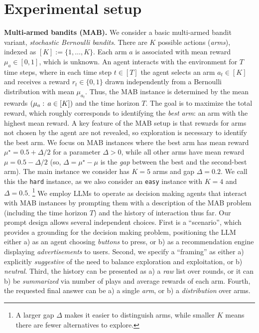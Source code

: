 \documentclass[11pt]{article}
\newcommand{\easy}{\texttt{easy}\xspace}
\newcommand{\hard}{\texttt{hard}\xspace}
\newcommand{\xhdr}[1]{\vspace{2mm} \noindent{\bf #1}}
\begin{document}
\section{Experimental setup}
\label{sec:setup}
\noindent\textbf{Multi-armed bandits (MAB).} We consider a basic multi-armed bandit variant, \emph{stochastic Bernoulli bandits}. There are $K$ possible actions (\emph{arms}), indexed as $[K]:=\{1,\ldots,K\}$. Each arm $a$ is associated with mean reward $\mu_a\in[0,1]$, which is unknown.
An agent interacts with the environment for $T$ time steps, where in each time step $t\in [T]$ the agent selects an arm $a_t \in [K]$ and receives a reward $r_t\in\{0,1\}$ drawn independently from a Bernoulli distribution with mean $\mu_{a_t}$. Thus, the MAB instance is determined by the mean rewards $\left(\mu_a:\,a\in[K]\right)$ and the time horizon $T$. The goal is to maximize the total reward, which roughly corresponds to identifying the \emph{best arm}: an arm with the highest mean reward.
A key feature of the MAB setup is that rewards for arms not chosen by the agent are not revealed, so exploration is necessary to identify the best arm.
We focus on MAB instances where the best arm has mean reward $\mu^\star = 0.5+\Delta/2$ for a parameter $\Delta>0$, while all other arms have mean reward $\mu = 0.5-\Delta/2$ (so, $\Delta = \mu^\star-\mu$ is the \emph{gap} between the best and the second-best arm).
The main instance we consider has $K=5$ arms and gap $\Delta=0.2$. We call this the \hard instance, as we also consider an \easy instance with $K=4$ and $\Delta=0.5$.
\footnote{A larger gap $\Delta$ makes it easier to distinguish arms, while smaller $K$ means there are fewer alternatives to explore.}
\xhdr{Prompts.}
We employ LLMs to operate as decision making agents that interact with MAB instances by prompting them
with a description of the MAB problem (including the time horizon $T$) and the history of interaction thus far. Our prompt design allows several independent choices.
First is a ``scenario'', which provides a grounding for the decision making problem, positioning the LLM either a) as an agent choosing \emph{buttons} to press, or b) as a recommendation engine displaying \emph{advertisements} to users.
Second, we specify a ``framing'' as either a) explicitly \emph{suggestive} of the need to balance exploration and exploitation, or b) \emph{neutral}.
Third, the history can be presented as a) a \emph{raw} list over rounds, or it can b) be \emph{summarized} via number of plays and average rewards of each arm.
Fourth, the requested final answer can be a) a single \emph{arm}, or b) a \emph{distribution} over arms.
\end{document}
